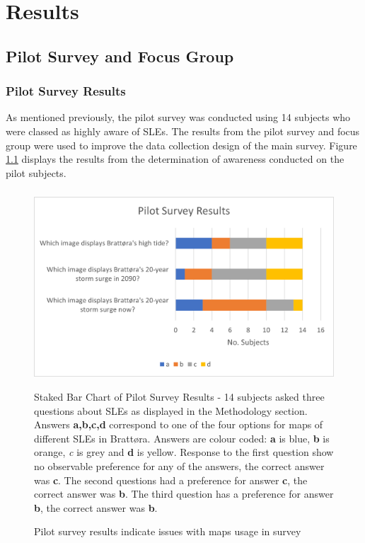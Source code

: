 \chapter{Results}

\section{Pilot Survey and Focus Group}

\subsection{Pilot Survey Results}
As mentioned previously, the pilot survey was conducted using 14 subjects who were classed as highly aware of SLEs. The results from the pilot survey and focus group were used to improve the data collection design of the main survey. Figure \ref{fig:pilot_survey_results} displays the results from the determination of awareness conducted on the pilot subjects.
\paragraph{}


\begin{figure}[H]
    \centering
    \includegraphics{fig_results/pilot_survey_results.png}
    \caption{Pilot survey results indicate issues with maps usage in survey}{Staked Bar Chart of Pilot Survey Results - 14 subjects asked three questions about SLEs as displayed in the Methodology section. Answers \textbf{a,b,c,d} correspond to one of the four options for maps of different SLEs in Brattøra. Answers are colour coded: \textbf{a} is blue, \textbf{b} is orange, \textit{c} is grey and \textbf{d} is yellow. Response to the first question show no observable preference for any of the answers, the correct answer was \textbf{c}. The second questions had a preference for answer \textbf{c}, the correct answer was \textbf{b}. The third question has a preference for answer \textbf{b}, the correct answer was \textbf{b}.}
    \label{fig:pilot_survey_results}
\end{figure}

